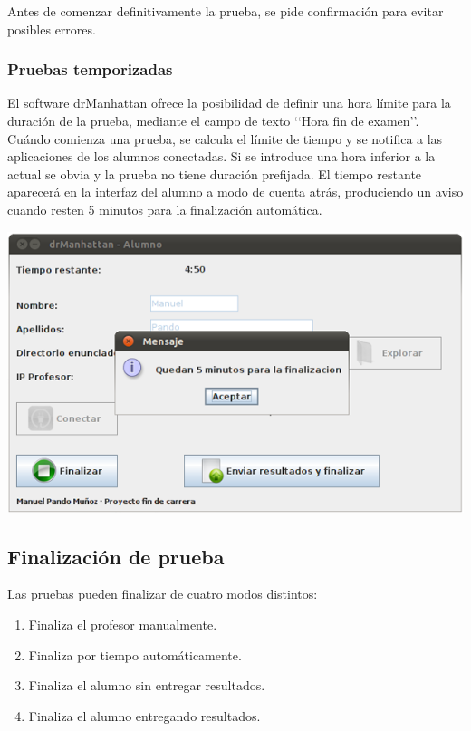 \documentclass[11pt]{article}
\begin{document}
Antes de comenzar definitivamente la prueba, se pide confirmación para evitar posibles errores.




\subsubsection{Pruebas temporizadas}

El software drManhattan ofrece la posibilidad de definir una hora límite para la duración de la prueba, mediante el campo de texto \lq\lq Hora fin de examen\rq\rq. Cuándo comienza una prueba, se calcula el límite de tiempo y se notifica a las aplicaciones de los alumnos conectadas. Si se introduce una hora inferior a la actual se obvia y la prueba no tiene duración prefijada. El tiempo restante aparecerá en la interfaz del alumno a modo de cuenta atrás, produciendo un aviso cuando resten 5 minutos para la finalización automática.

\begin{center}
    \includegraphics[width=.90\linewidth]{imagenes/tiempoLimite}
\end{center}


\subsection{Finalización de prueba}
\label{sec:finalizacionPrueba}

Las pruebas pueden finalizar de cuatro modos distintos:

\begin{enumerate}

    \item Finaliza el profesor manualmente.

    \item Finaliza por tiempo automáticamente.

    \item Finaliza el alumno sin entregar resultados.

    \item Finaliza el alumno entregando resultados.

\end{enumerate}
\end{document}
